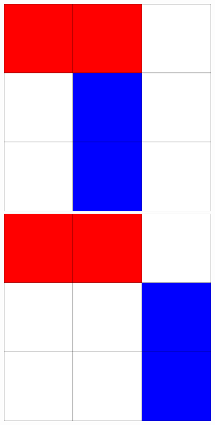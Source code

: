 \documentclass[12pt]{ctexart}
\begin{document}
\begin{figure}[htbp]
	\centering
	\begin{minipage}[t]{0.3\textwidth}
		\centering
		\includegraphics{pictures/1-1.png}
		\caption{}
	\end{minipage}
	\begin{minipage}[t]{0.3\textwidth}
		\centering
		\includegraphics{pictures/1-2.png}

\end{minipage}
\end{figure}
\end{document}
